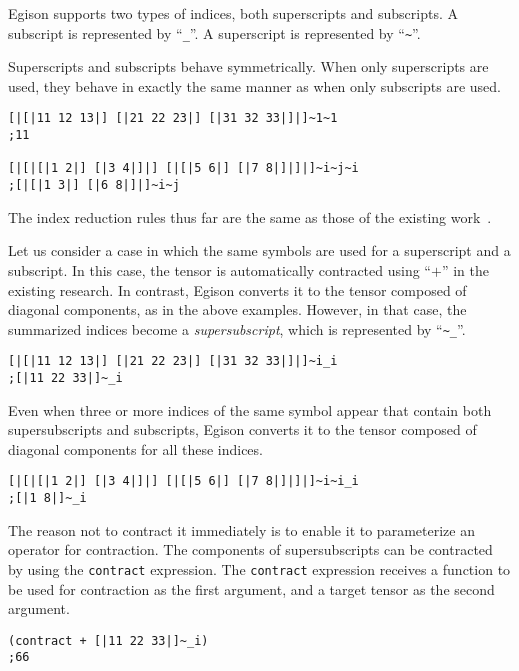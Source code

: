 \documentclass[acmlarge]{acmart}
\begin{document}
Egison supports two types of indices, both superscripts and subscripts.
A subscript is represented by ``\verb|_|''.
A superscript is represented by ``\texttt{\~}''.

Superscripts and subscripts behave symmetrically.
When only superscripts are used, they behave in exactly the same manner as when only subscripts are used.

{\footnotesize
\begin{verbatim}
[|[|11 12 13|] [|21 22 23|] [|31 32 33|]|]~1~1
;11

[|[|[|1 2|] [|3 4|]|] [|[|5 6|] [|7 8|]|]|]~i~j~i
;[|[|1 3|] [|6 8|]|]~i~j
\end{verbatim}
}

The index reduction rules thus far are the same as those of the existing work~\cite{aahlander2002einstein}.

Let us consider a case in which the same symbols are used for a superscript and a subscript.
In this case, the tensor is automatically contracted using ``$+$'' in the existing research.
In contrast, Egison converts it to the tensor composed of diagonal components, as in the above examples.
However, in that case, the summarized indices become a \textit{supersubscript}, which is represented by ``\verb|~_|''.

{\footnotesize
\begin{verbatim}
[|[|11 12 13|] [|21 22 23|] [|31 32 33|]|]~i_i
;[|11 22 33|]~_i
\end{verbatim}
}

Even when three or more indices of the same symbol appear that contain both supersubscripts and subscripts, Egison converts it to the tensor composed of diagonal components for all these indices.

{\footnotesize
\begin{verbatim}
[|[|[|1 2|] [|3 4|]|] [|[|5 6|] [|7 8|]|]|]~i~i_i
;[|1 8|]~_i
\end{verbatim}
}

The reason not to contract it immediately is to enable it to parameterize an operator for contraction.
The components of supersubscripts can be contracted by using the \texttt{contract} expression.
The \texttt{contract} expression receives a function to be used for contraction as the first argument, and a target tensor as the second argument.

{\footnotesize
\begin{verbatim}
(contract + [|11 22 33|]~_i)
;66
\end{verbatim}
}
\end{document}
